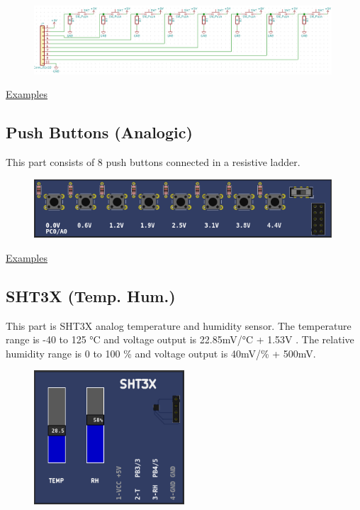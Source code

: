 \begin{figure}[H]
\center
\includegraphics[width=0.99\textwidth]{img/part_buttons_.png} 
\end{figure} 

\href{https://lcgamboa.github.io/picsimlab_examples/Parts.html\#Push_Buttons}{Examples}


\subsection{Push Buttons (Analogic)}


This part consists of 8 push buttons connected in a resistive ladder.

\begin{figure}[H]
\center
\includegraphics[width=0.99\textwidth]{img/part_push_a.png} 
\end{figure}

\href{https://lcgamboa.github.io/picsimlab_examples/Parts.html\#Push_Buttons_(Analogic)}{Examples}

\subsection{SHT3X (Temp. Hum.)}

This part is SHT3X analog temperature and humidity sensor. The temperature  range is -40 to 125 °C  and 
voltage output is 22.85mV/°C + 1.53V . The relative humidity range is 0 to 100 \%  and voltage output is 40mV/\% + 500mV.

\begin{figure}[H]
\center
\includegraphics[width=0.5\textwidth]{img/part_sht3x.png} 
\end{figure} 


